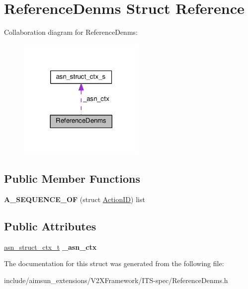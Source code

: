 \hypertarget{structReferenceDenms}{}\section{Reference\+Denms Struct Reference}
\label{structReferenceDenms}


Collaboration diagram for Reference\+Denms\+:\nopagebreak
\begin{figure}[H]
\begin{center}
\leavevmode
\includegraphics[width=173pt]{structReferenceDenms__coll__graph}
\end{center}
\end{figure}
\subsection*{Public Member Functions}
\begin{DoxyCompactItemize}
\item 
{\bfseries A\+\_\+\+S\+E\+Q\+U\+E\+N\+C\+E\+\_\+\+OF} (struct \hyperlink{structActionID}{Action\+ID}) list\hypertarget{structReferenceDenms_a97d12590afb56a1ee01bba348b281f5d}{}\label{structReferenceDenms_a97d12590afb56a1ee01bba348b281f5d}

\end{DoxyCompactItemize}
\subsection*{Public Attributes}
\begin{DoxyCompactItemize}
\item 
\hyperlink{structasn__struct__ctx__s}{asn\+\_\+struct\+\_\+ctx\+\_\+t} {\bfseries \+\_\+asn\+\_\+ctx}\hypertarget{structReferenceDenms_ab0c70221088ffb7f32843ac250b90e16}{}\label{structReferenceDenms_ab0c70221088ffb7f32843ac250b90e16}

\end{DoxyCompactItemize}


The documentation for this struct was generated from the following file\+:\begin{DoxyCompactItemize}
\item 
include/aimsun\+\_\+extensions/\+V2\+X\+Framework/\+I\+T\+S-\/spec/Reference\+Denms.\+h\end{DoxyCompactItemize}

